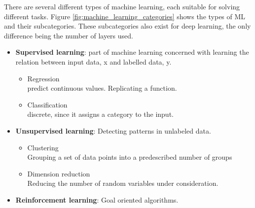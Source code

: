 \documentclass{article}
\begin{document}
There are several different types of machine learning, each suitable for solving different tasks. Figure \ref{fig:machine_learning_categories} shows the types of ML and their subcategories. These subcategories also exist for deep learning, the only difference being the number of layers used.

 

\begin{itemize}
    \item \textbf{Supervised learning}: part of machine learning concerned with learning the relation between input data, x and labelled data, y.
    \begin{itemize}
        \item Regression\\predict continuous values. Replicating a function.
        \item Classification\\discrete, since it assigns a category to the input.
    \end{itemize}
    \item \textbf{Unsupervised learning}: Detecting patterns in unlabeled data.
    \begin{itemize}
        \item Clustering\\Grouping a set of data points into a predescribed number of groups
        \item Dimension reduction\\Reducing the number of random variables under consideration.
    \end{itemize}
    \item \textbf{Reinforcement learning}: Goal oriented algorithms.
\end{itemize}
\end{document}
